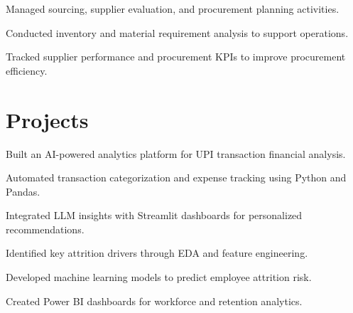 \documentclass[]{deedy-resume-reversed}
\begin{document}
\begin{minipage}[t]{0.65\textwidth}
\sectionsep


\begin{tightemize}
\item Managed sourcing, supplier evaluation, and procurement planning activities.
\item Conducted inventory and material requirement analysis to support operations.
\item Tracked supplier performance and procurement KPIs to improve procurement efficiency.
\end{tightemize}


\sectionsep


\section{Projects}


\begin{tightemize}
\item Built an AI-powered analytics platform for UPI transaction financial analysis.
\item Automated transaction categorization and expense tracking using Python and Pandas.
\item Integrated LLM insights with Streamlit dashboards for personalized recommendations.
\end{tightemize}

\sectionsep


\begin{tightemize}
\item Identified key attrition drivers through EDA and feature engineering.
\item Developed machine learning models to predict employee attrition risk.
\item Created Power BI dashboards for workforce and retention analytics.
\end{tightemize}


\end{minipage}
\end{document}

